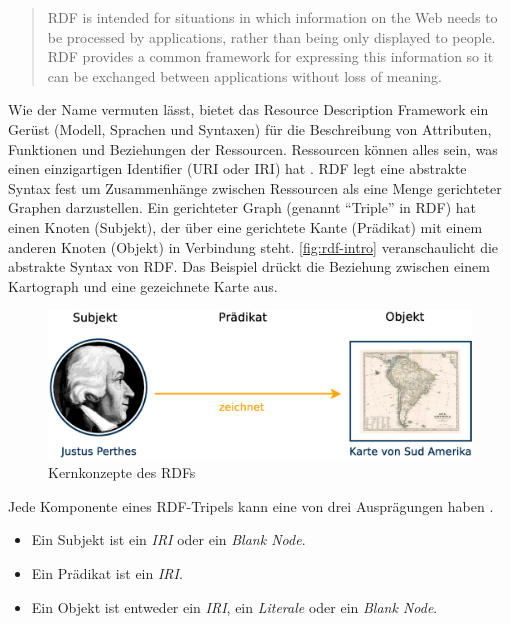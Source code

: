 \documentclass[../main.tex]{subfiles}
\begin{document}
\hyphenblockquote{german}{RDF is intended for situations in which information on the Web needs to be processed by applications, rather than being only displayed to people. RDF provides a common framework for expressing this information so it can be exchanged between applications without loss of meaning.} 

Wie der Name vermuten lässt, bietet das Resource Description Framework ein Gerüst (Modell, Sprachen und Syntaxen) für die Beschreibung von Attributen, Funktionen und Beziehungen der Ressourcen. Ressourcen können alles sein, was einen einzigartigen Identifier (URI oder IRI) hat \autocite[vgl.][Folie~6]{Dekeyzer2013}. RDF legt eine abstrakte Syntax fest um Zusammenhänge zwischen Ressourcen als eine Menge gerichteter Graphen darzustellen. Ein gerichteter Graph (genannt \hyphenquote{german}{Triple} in RDF) hat einen Knoten (Subjekt), der über eine gerichtete Kante (Prädikat) mit einem anderen Knoten (Objekt) in Verbindung steht. \autoref{fig:rdf-intro} veranschaulicht die abstrakte Syntax von RDF. Das Beispiel\footnotemark{} drückt die Beziehung zwischen einem Kartograph und eine gezeichnete Karte aus.


\begin{figure}[h]
	\centering
	\includegraphics[width=1\linewidth]{images/spo}
	\caption[Kernkonzepte des RDFs]{Kernkonzepte des RDFs}
	\label{fig:spo}
\end{figure}

Jede Komponente eines RDF-Tripels kann eine von drei Ausprägungen haben \autocite[vgl.][Abs.~3.1]{Wood:14:RCA}.

\begin{itemize}
	\item Ein Subjekt ist ein \textit{IRI} oder ein \textit{Blank Node}.
	\item Ein Prädikat ist ein \textit{IRI}.
	\item Ein Objekt ist entweder ein \textit{IRI}, ein \textit{Literale} oder ein \textit{Blank Node}.
\end{itemize}
\end{document}
